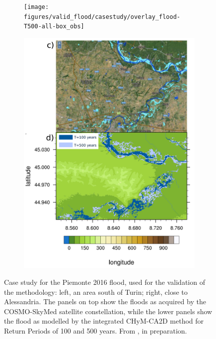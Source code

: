 \begin{figure}
    \centering
    \begin{subfigure}{7.3cm}
        \texttt{[image: figures/valid\_flood/casestudy/overlay\_flood-T500-all-box\_obs]}
    \end{subfigure}
    \begin{subfigure}{6cm}
        \includegraphics[width=\textwidth]{figures/valid_flood/casestudy/overlay_flood-T500-alessandria}
    \end{subfigure}
    \decoRule
    \caption[Case study: Piemonte 2016 flood]{
        Case study for the Piemonte 2016 flood, used for the validation of the methodology: left, an area south of Turin; right, close to Alessandria.
        The panels on top show the floods as acquired by the COSMO-SkyMed satellite constellation, while the lower panels show the flood as modelled by the integrated CHyM-CA2D method for Return Periods of 100 and 500 years. From \citet{Nogherotto2018}, in preparation.
    }\label{fig:valid_casestudy}
\end{figure}

